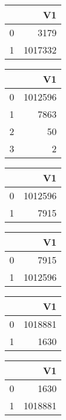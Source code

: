 \bigskip\bigskip
\centering
\begin{tabular}{rr}
  \hline
 & V1 \\ 
  \hline
0 & 3179 \\ 
  1 & 1017332 \\ 
   \hline
\end{tabular}

\bigskip\bigskip
\centering
\begin{tabular}{rr}
  \hline
 & V1 \\ 
  \hline
0 & 1012596 \\ 
  1 & 7863 \\ 
  2 &  50 \\ 
  3 &   2 \\ 
   \hline
\end{tabular}

\bigskip\bigskip
\centering
\begin{tabular}{rr}
  \hline
 & V1 \\ 
  \hline
0 & 1012596 \\ 
  1 & 7915 \\ 
   \hline
\end{tabular}

\bigskip\bigskip
\centering
\begin{tabular}{rr}
  \hline
 & V1 \\ 
  \hline
0 & 7915 \\ 
  1 & 1012596 \\ 
   \hline
\end{tabular}

\bigskip\bigskip
\centering
\begin{tabular}{rr}
  \hline
 & V1 \\ 
  \hline
0 & 1018881 \\ 
  1 & 1630 \\ 
   \hline
\end{tabular}

\bigskip\bigskip
\centering
\begin{tabular}{rr}
  \hline
 & V1 \\ 
  \hline
0 & 1630 \\ 
  1 & 1018881 \\ 
   \hline
\end{tabular}

